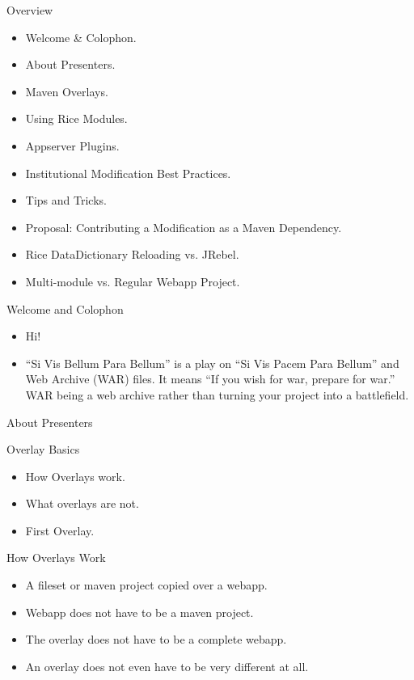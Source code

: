 \documentclass[xcolor=dvipsnames,14pt,professionalfonts]{beamer}
\begin{document}
\begin{frame}{Overview}
  \begin{itemize}
  \item Welcome \& Colophon.
  \item About Presenters.
  \item Maven Overlays.
  \item Using Rice Modules.
  \item Appserver Plugins.
  \item Institutional Modification Best Practices.
  \item Tips and Tricks.
  \item Proposal: Contributing a Modification as a Maven Dependency.
  \item Rice DataDictionary Reloading vs. JRebel.
  \item Multi-module vs. Regular Webapp Project.
  \end{itemize}
\end{frame}

\begin{frame}{Welcome and Colophon}
  \begin{itemize}
    \item Hi!
    \item ``Si Vis Bellum Para Bellum'' is a play on ``Si Vis Pacem
      Para Bellum'' and Web Archive (WAR) files. It means ``If you
      wish for war, prepare for war.'' WAR being a web archive rather than turning your project into a battlefield.
  \end{itemize}
\end{frame}

\begin{frame}{About Presenters}
\end{frame}

\begin{frame}{Overlay Basics}
  \begin{itemize}
  \item How Overlays work.
  \item What overlays are not.
  \item First Overlay.
  \end{itemize}
\end{frame}

\begin{frame}{How Overlays Work}
  \begin{itemize}
    \item A fileset or maven project copied over a webapp.
    \item Webapp does not have to be a maven project.
    \item The overlay does not have to be a complete webapp.
    \item An overlay does not even have to be very different at all.
  \end{itemize}
\end{frame}
\end{document}
